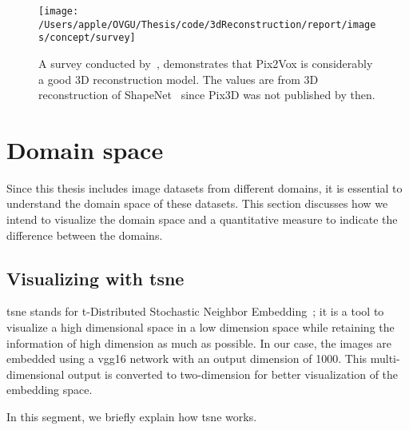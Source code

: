 \begin{figure}[ht]
    \centering
    \texttt{[image: /Users/apple/OVGU/Thesis/code/3dReconstruction/report/images/concept/survey]}
    \caption{A survey conducted by~\cite{Han2021ImageBased3O}, demonstrates that Pix2Vox is considerably a good 3D reconstruction model.
    The values are from 3D reconstruction of ShapeNet~\cite{chang2015shapenet} since Pix3D was not published by then.}
    \label{fig:survey on 3d reconstruction}
\end{figure}


\section{Domain space}\label{sec:domain-space}

Since this thesis includes image datasets from different domains, it is essential to understand the domain space of these datasets.
This section discusses how we intend to visualize the domain space and a quantitative measure to indicate the difference between the domains.

\subsection{Visualizing with \gls{tsne}}\label{subsec:visualizing-with-tsne}
\gls{tsne} stands for t-Distributed Stochastic Neighbor Embedding~\cite{vanDerMaaten2008}; it is a tool to visualize a high dimensional space in a low dimension space while retaining the information of high dimension as much as possible.
In our case, the images are embedded using a \gls{vgg}16 network with an output dimension of 1000.
This multi-dimensional output is converted to two-dimension for better visualization of the embedding space.

In this segment, we briefly explain how \gls{tsne} works.

